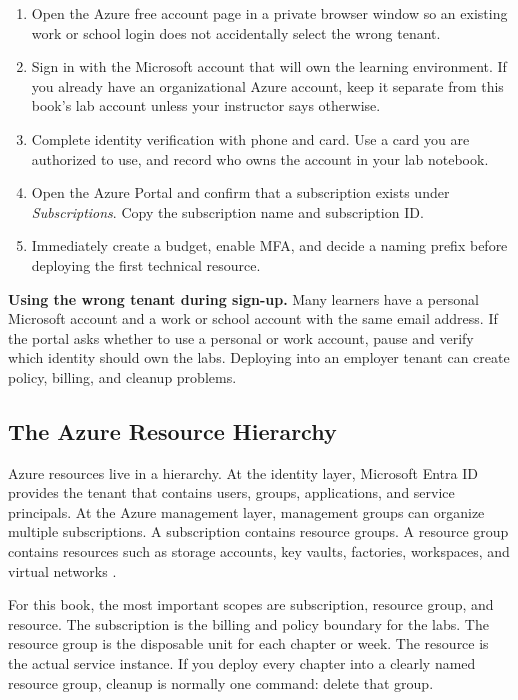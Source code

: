 \begin{enumerate}
    \item Open the Azure free account page in a private browser window so an existing work or school login does not accidentally select the wrong tenant.
    \item Sign in with the Microsoft account that will own the learning environment. If you already have an organizational Azure account, keep it separate from this book's lab account unless your instructor says otherwise.
    \item Complete identity verification with phone and card. Use a card you are authorized to use, and record who owns the account in your lab notebook.
    \item Open the Azure Portal and confirm that a subscription exists under \textit{Subscriptions}. Copy the subscription name and subscription ID.
    \item Immediately create a budget, enable MFA, and decide a naming prefix before deploying the first technical resource.
\end{enumerate}

\begin{pitfall}
\textbf{Using the wrong tenant during sign-up.} Many learners have a personal Microsoft account and a work or school account with the same email address. If the portal asks whether to use a personal or work account, pause and verify which identity should own the labs. Deploying into an employer tenant can create policy, billing, and cleanup problems.
\end{pitfall}

\subsection{The Azure Resource Hierarchy}
Azure resources live in a hierarchy. At the identity layer, Microsoft Entra ID provides the tenant that contains users, groups, applications, and service principals. At the Azure management layer, management groups can organize multiple subscriptions. A subscription contains resource groups. A resource group contains resources such as storage accounts, key vaults, factories, workspaces, and virtual networks \cite{microsoft2025accountHierarchy}.

For this book, the most important scopes are subscription, resource group, and resource. The subscription is the billing and policy boundary for the labs. The resource group is the disposable unit for each chapter or week. The resource is the actual service instance. If you deploy every chapter into a clearly named resource group, cleanup is normally one command: delete that group.

